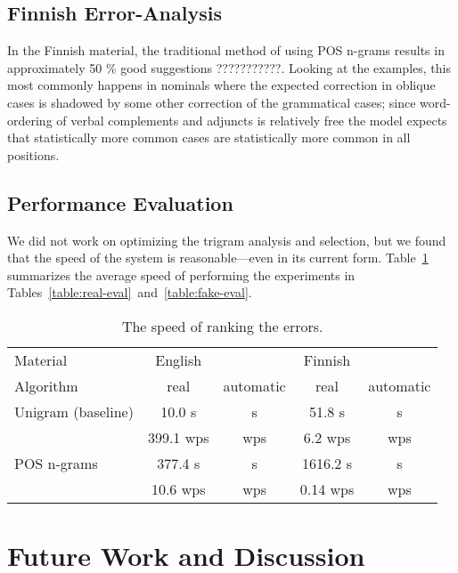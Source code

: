 \documentclass{llncs}
\begin{document}
\subsection{Finnish Error-Analysis}

In the Finnish material, the traditional method of using POS n-grams results
in approximately 50 \% good suggestions ???????????. Looking at the examples, this
most commonly happens in nominals where the expected correction in oblique
cases is shadowed by some other correction of the grammatical cases; since word-ordering
of verbal complements and adjuncts is relatively free the model expects that
statistically more common cases are statistically more common in all positions.

\subsection{Performance Evaluation}

We did not work on optimizing the trigram analysis and selection,
but we found that the speed of the system is reasonable---even in its current
form. Table~\ref{table:speed-eval} summarizes the average
speed of performing the experiments in Tables~\ref{table:real-eval}~and~\ref{table:fake-eval}.

\begin{table}
    \caption{The speed of ranking the errors.
    \label{table:speed-eval}}
  \begin{center}
      \begin{tabular}{lcccc}
        \hline
        Material  & English &  & Finnish &  \\
        Algorithm & real    &  automatic         & real    &  automatic         \\
        \hline
        Unigram (baseline)   &    10.0 s &      s & 51.8 s &     s  \\
         & 399.1 wps &    wps & 6.2 wps &   wps  \\
        \hline
        POS n-grams   &   377.4 s &     s & 1616.2 s &     s  \\
          & 10.6  wps &   wps & 0.14 wps &   wps  \\
        \hline
      \end{tabular}
  \end{center}
\end{table}


\section{Future Work and Discussion}
\label{sec:future-work}
\end{document}
